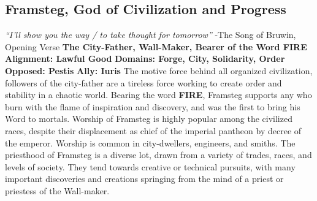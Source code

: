 \subsection{Framsteg,  God of Civilization and Progress}\label{god:framsteg}
\textit{“I’ll show you the way / to take thought for tomorrow”}
\break
\hspace*{\fill} -The Song of Bruwin, Opening Verse
\break
\break
\textbf{The City-Father, Wall-Maker, Bearer of the Word FIRE}\break
\hspace*{\fill}\break
\textbf{Alignment:\hspace*{\fill} Lawful Good} \break
\textbf{Domains:\hspace*{\fill} Forge, City, Solidarity, Order} \break
\textbf{Opposed:\hspace*{\fill} Pestis} \break
\textbf{Ally:\hspace*{\fill} Iuris} \break
\hspace*{\fill}\break
The motive force behind all organized civilization, followers of the city-father are a tireless force working to create order and stability in a chaotic world. Bearing the word \textbf{FIRE}, Framsteg supports any who burn with the flame of inspiration and discovery, and was the first to bring his Word to mortals.\newline
Worship of Framsteg is highly popular among the civilized races, despite their displacement as chief of the imperial pantheon by decree of the emperor. Worship is common in city-dwellers, engineers, and smiths.\newline
The priesthood of Framsteg is a diverse lot, drawn from a variety of trades, races, and levels of society.  They tend towards creative or technical pursuits, with many important discoveries and creations springing from the mind of a priest or priestess of the Wall-maker.

